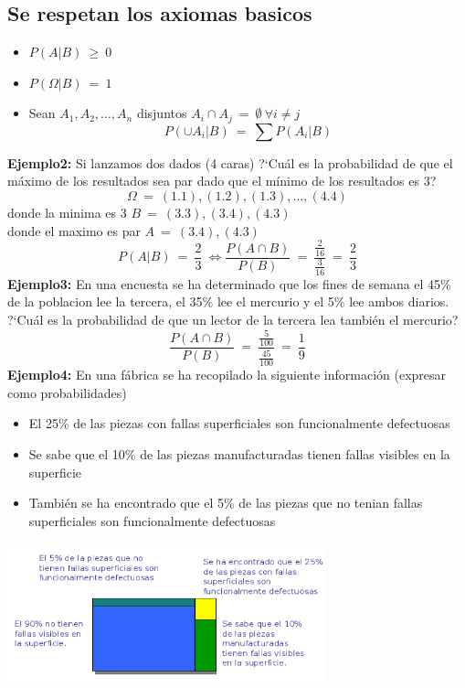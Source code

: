 \subsection{Se respetan los axiomas basicos}
\begin{itemize}
	\item $P(A|B)\ \geq\ 0$
	\item $P(\Omega|B)\ =\ 1$
	\item Sean $A_{1},A_{2},\ldots,A_{n}$ disjuntos $A_{i}\cap A_{j}\ =\ \emptyset\ \forall i\neq j$
	$$P(\cup A_{i}|B)\ =\ \sum P(A_{i}|B)$$
\end{itemize}
\textbf{Ejemplo2:} Si lanzamos dos dados (4 caras) ?`Cu\'al es la probabilidad de que el m\'aximo
	de los resultados sea par dado que el m\'inimo de los resultados es 3?\\
	$$\Omega\ =\ {(1.1),(1.2),(1.3),\ldots,(4.4)}$$
	donde la minima es 3 $B\ =\ {(3.3),(3.4),(4.3)}$\\
	donde el maximo es par $A\ =\ {(3.4),(4.3)}$\\
	$$P(A|B)\ =\ \frac{2}{3}\ \Longleftrightarrow \frac{P(A\cap B)}{P(B)}\ =\ \frac{\frac{2}{16}}{\frac{3}{16}}\ =\ \frac{2}{3}$$
\textbf{Ejemplo3:} En una encuesta se ha determinado que los fines de semana el 45\% de la poblacion
	lee la tercera, el 35\% lee el mercurio y el 5\% lee ambos diarios. ?`Cu\'al es la probabilidad
	de que un lector de la tercera lea tambi\'en el mercurio?\\
	$$\frac{P(A\cap B)}{P(B)}\ =\ \frac{\frac{5}{100}}{\frac{45}{100}}\ =\ \frac{1}{9}$$
\textbf{Ejemplo4:} En una f\'abrica se ha recopilado la siguiente informaci\'on (expresar como probabilidades)
	\begin{itemize}
		\item El 25\% de las piezas con fallas superficiales son funcionalmente defectuosas
		\item Se sabe que el 10\% de las piezas manufacturadas tienen fallas visibles
		en la superficie
		\item Tambi\'en se ha encontrado que el 5\% de las piezas que no tenian fallas
		superficiales son funcionalmente defectuosas
	\end{itemize}
	\begin{center}
		\includegraphics[height=4cm]{images/cap6_ej4_1}
	\end{center}
